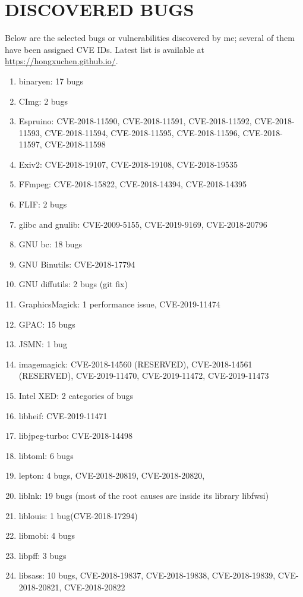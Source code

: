 \documentclass[paper=a4,fontsize=11pt]{article} %
\newcommand{\NewPart}[1]{\section*{\uppercase{#1}}}
\begin{document}
\NewPart{Discovered Bugs}
Below are the selected bugs or vulnerabilities discovered by me; several of them have been assigned CVE IDs. Latest list is available at \url{https://hongxuchen.github.io/}.
\begin{enumerate}
    \item binaryen: 17 bugs
    \item CImg: 2 bugs
    \item Espruino: CVE-2018-11590, CVE-2018-11591, CVE-2018-11592, CVE-2018-11593, CVE-2018-11594, CVE-2018-11595, CVE-2018-11596, CVE-2018-11597, CVE-2018-11598
    \item Exiv2: CVE-2018-19107, CVE-2018-19108, CVE-2018-19535
    \item FFmpeg: CVE-2018-15822, CVE-2018-14394, CVE-2018-14395
    \item FLIF: 2 bugs
    \item glibc and gnulib: CVE-2009-5155, CVE-2019-9169, CVE-2018-20796
    \item GNU bc: 18 bugs
    \item GNU Binutils: CVE-2018-17794
    \item GNU diffutils: 2 bugs (git fix)
    \item GraphicsMagick: 1 performance issue, CVE-2019-11474
    \item GPAC: 15 bugs
    \item JSMN: 1 bug
    \item imagemagick: CVE-2018-14560 (RESERVED), CVE-2018-14561 (RESERVED), CVE-2019-11470, CVE-2019-11472, CVE-2019-11473
    \item Intel XED: 2 categories of bugs
    \item libheif: CVE-2019-11471
    \item libjpeg-turbo: CVE-2018-14498
    \item libtoml: 6 bugs
    \item lepton: 4 bugs, CVE-2018-20819, CVE-2018-20820,
    \item liblnk: 19 bugs (most of the root causes are inside its library libfwsi)
    \item liblouis: 1 bug(CVE-2018-17294)
    \item libmobi: 4 bugs
    \item libpff: 3 bugs
    \item libsass: 10 bugs, CVE-2018-19837, CVE-2018-19838, CVE-2018-19839, CVE-2018-20821, CVE-2018-20822

\end{enumerate}
\end{document}
